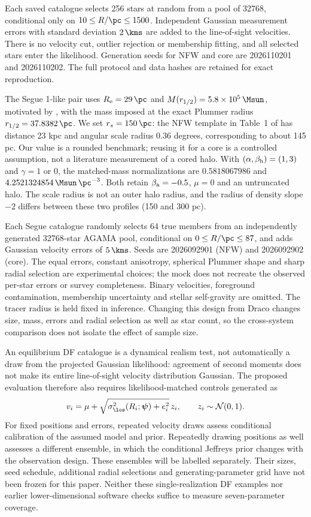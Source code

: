 Each saved catalogue selects 256 stars at random from a pool of 32768, conditional only on $10\leq R/\pc\leq1500$. Independent Gaussian measurement errors with standard deviation $2\,\kms$ are added to the line-of-sight velocities. There is no velocity cut, outlier rejection or membership fitting, and all selected stars enter the likelihood. Generation seeds for NFW and core are 2026110201 and 2026110202. The full protocol and data hashes are retained for exact reproduction.

The Segue 1-like pair uses $R_{\rm e}=29\,\pc$ and $M(r_{1/2})=5.8\times10^5\,\Msun$, motivated by \citet{simon2011segue}, with the mass imposed at the exact Plummer radius $r_{1/2}=37.8382\,\pc$. We set $r_s=150\,\pc$: the NFW template in Table~1 of \citet{ahnen2016combined} has distance 23 kpc and angular scale radius $0.36$ degrees, corresponding to about 145 pc. Our value is a rounded benchmark; reusing it for a core is a controlled assumption, not a literature measurement of a cored halo. With $(\alpha,\beta_{\rm h})=(1,3)$ and $\gamma=1$ or 0, the matched-mass normalizations are $0.5818067986$ and $4.2521324854\,\Msun\,\pc^{-3}$. Both retain $\beta_{\rm a}=-0.5$, $\mu=0$ and an untruncated halo. The scale radius is not an outer halo radius, and the radius of density slope $-2$ differs between these two profiles (150 and 300 pc).

Each Segue catalogue randomly selects 64 true members from an independently generated 32768-star AGAMA pool, conditional on $0\leq R/\pc\leq87$, and adds Gaussian velocity errors of $5\,\kms$. Seeds are 2026092901 (NFW) and 2026092902 (core). The equal errors, constant anisotropy, spherical Plummer shape and sharp radial selection are experimental choices; the mock does not recreate the observed per-star errors or survey completeness. Binary velocities, foreground contamination, membership uncertainty and stellar self-gravity are omitted. The tracer radius is held fixed in inference. Changing this design from Draco changes size, mass, errors and radial selection as well as star count, so the cross-system comparison does not isolate the effect of sample size.

An equilibrium DF catalogue is a dynamical realism test, not automatically a draw from the projected Gaussian likelihood: agreement of second moments does not make its entire line-of-sight velocity distribution Gaussian. The proposed evaluation therefore also requires likelihood-matched controls generated as
\begin{equation}
 v_i=\mu+\sqrt{\sigma_{\los}^2(R_i;\boldsymbol{\psi})+e_i^2}\,z_i,
 \qquad z_i\sim\mathcal N(0,1).
\end{equation}
For fixed positions and errors, repeated velocity draws assess conditional calibration of the assumed model and prior. Repeatedly drawing positions as well assesses a different ensemble, in which the conditional Jeffreys prior changes with the observation design. These ensembles will be labelled separately. Their sizes, seed schedule, additional radial selections and generating-parameter grid have not been frozen for this paper. Neither these single-realization DF examples nor earlier lower-dimensional software checks suffice to measure seven-parameter coverage.

